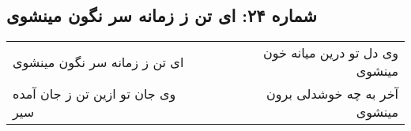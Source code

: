 \begin{center}
\section*{شماره ۲۴: ای تن ز زمانه سر نگون مینشوی}
\label{sec:024}
\begin{longtable}{l p{0.5cm} r}
ای تن ز زمانه سر نگون مینشوی
&&
وی دل تو درین میانه خون مینشوی
\\
وی جان تو ازین تن ز جان آمده سیر
&&
آخر به چه خوشدلی برون مینشوی
\\
\end{longtable}
\end{center}
